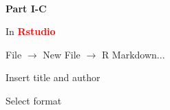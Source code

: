 \documentclass{presentatiesmetlogo}
\newcommand{\redbf}[1]{\textcolor{red}{\textbf{#1}}}
\begin{document}
\newpage
\mbox{ }
\vspace{5cm}
\begin{center}
{\Huge \textbf{Part I-C}}
\end{center}
\bitem
\item In \redbf{Rstudio}
\newline
\newline
\bitemt
\item File $\rightarrow$ New File $\rightarrow$ R Markdown...
\item Insert title and author
\item Select format
\eitemt
\eitem


\label{einde document}
\end{document}
